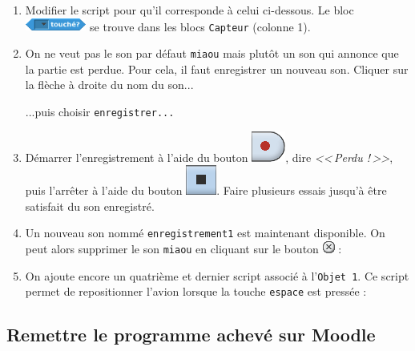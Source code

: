 \begin{enumerate}
\item Modifier le script pour qu'il corresponde à celui ci-dessous. Le bloc \includegraphics[width=2cm]{./images/scratch/BlocCapteur} se trouve dans les blocs \texttt{Capteur} (colonne 1).
\item On ne veut pas le son par défaut \texttt{miaou} mais plutôt un son qui annonce que la partie est perdue. Pour cela, il faut enregistrer un nouveau son. Cliquer sur la flèche à droite du nom du son...

...puis choisir \texttt{enregistrer...}

\item Démarrer l'enregistrement à l'aide du bouton \includegraphics[width=.7cm]{./images/scratch/SonEnregistre}, dire \emph{<<\,Perdu !\,>>}, puis l'arrêter à l'aide du bouton \includegraphics[width=.7cm]{./images/scratch/SonStop}. Faire plusieurs essais jusqu'à être satisfait du son enregistré.
\item Un nouveau son nommé \texttt{enregistrement1} est maintenant disponible. On peut alors supprimer le son \texttt{miaou} en cliquant sur le bouton \includegraphics[width=.7cm]{./images/scratch/Supprimer} :
\item On ajoute encore un quatrième et dernier script associé à l'\texttt{Objet 1}. Ce script permet de repositionner l'avion lorsque la touche \texttt{espace} est pressée :
\end{enumerate}






\subsection{Remettre le programme achevé sur Moodle}

